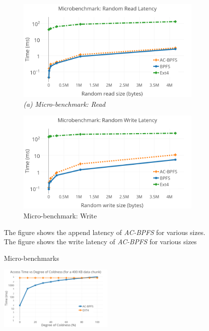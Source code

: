  \begin{figure}[t]\centering
\begin{subfigure}{.46\textwidth}
  \centering
  \includegraphics[width=\linewidth]{figs/read.png}
 	\centering
	\footnotesize\textit{(a) Micro-benchmark: Read}
\end{subfigure}
\begin{subfigure}{.46\textwidth}
  \centering
  \includegraphics[width=\textwidth]{figs/write.png}
\vspace{-0.2in}
\caption{Micro-benchmark: Write}
\end{subfigure}
\caption{Micro-benchmarks}{\footnotesize The figure shows the append latency of \textit{AC-BPFS} for various sizes. The figure shows the write latency of \textit{AC-BPFS} for various sizes}
\label{fig:fig}
\end{figure}


\begin{figure}
\centering
\vspace{-0.1in}
\includegraphics[width=0.5\textwidth]{figs/coldness.png}
\vspace{-0.1in}
\end{figure}


